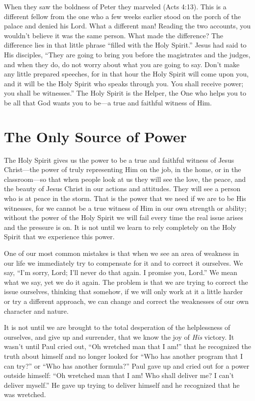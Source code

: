 When they saw the boldness of Peter they marveled
(Acts 4:13). This is a different fellow from the one who a few
weeks earlier stood on the porch of the palace and denied
his Lord. What a different man! Reading the two accounts,
you wouldn’t believe it was the same person. What made
the difference? The difference lies in that little phrase “filled
with the Holy Spirit.” Jesus had said to His disciples, “They
are going to bring you before the magistrates and the
judges, and when they do, do not worry about what you
are going to say. Don’t make any little prepared speeches,
for in that hour the Holy Spirit will come upon you, and it
will be the Holy Spirit who speaks through you. You shall
receive power; you shall be witnesses.” The Holy Spirit is
the Helper, the One who helps you to be all that God wants
you to be—a true and faithful witness of Him.


\section*{The Only Source of Power}

The Holy Spirit gives us the power to be a true and
faithful witness of Jesus Christ—the power of truly representing
Him on the job, in the home, or in the classroom—so
that when people look at us they will see the love, the peace,
and the beauty of Jesus Christ in our actions and attitudes.
They will see a person who is at peace in the storm. That is
the power that we need if we are to be His witnesses, for we
cannot be a true witness of Him in our own strength or ability;
without the power of the Holy Spirit we will fail every
time the real issue arises and the pressure is on. It is not
until we learn to rely completely on the Holy Spirit that we
experience this power.

One of our most common mistakes is that when we see
an area of weakness in our life we immediately try to compensate
for it and to correct it ourselves. We say, “I’m sorry,
Lord; I’ll never do that again. I promise you, Lord.” We
mean what we say, yet we do it again. The problem is that
we are trying to correct the issue ourselves, thinking that
somehow, if we will only work at it a little harder or try
a different approach, we can change and correct the weaknesses
of our own character and nature.

It is not until we are brought to the total desperation
of the helplessness of ourselves, and give up and surrender,
that we know the joy of \emph{His} victory. It wasn’t until Paul
cried out, “Oh wretched man that I am!” that he recognized
the truth about himself and no longer looked for “Who has
another program that I can try?” or “Who has another formula?”
Paul gave up and cried out for a power outside himself:
“Oh wretched man that I am! Who shall deliver me? I
can’t deliver myself.” He gave up trying to deliver himself
and he recognized that he was wretched.

